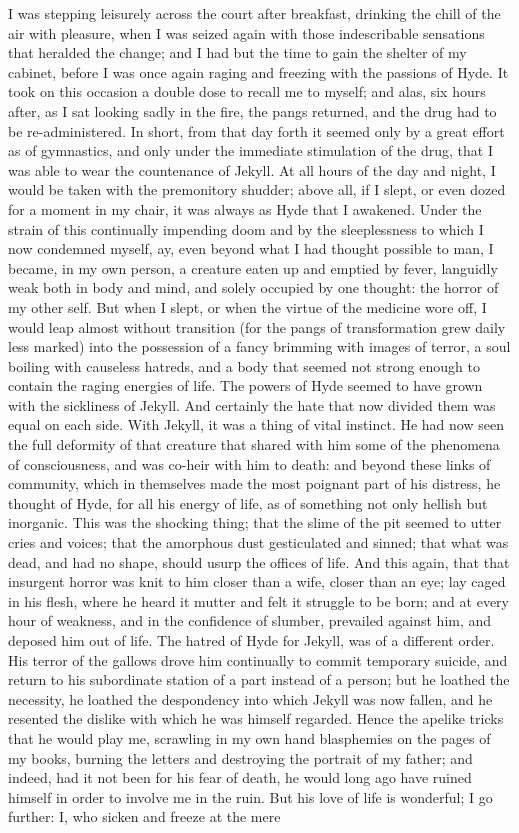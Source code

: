 \documentclass[]{novel}
\begin{document}
I was stepping leisurely across the court after breakfast, drinking the chill of the air with pleasure, when I was seized again with those indescribable sensations that heralded the change; and I had but the time to gain the shelter of my cabinet, before I was once again raging and freezing with the passions of Hyde. It took on this occasion a double dose to recall me to myself; and alas, six hours after, as I sat looking sadly in the fire, the pangs returned, and the drug had to be re-administered. In short, from that day forth it seemed only by a great effort as of gymnastics, and only under the immediate stimulation of the drug, that I was able to wear the countenance of Jekyll. At all hours of the day and night, I would be taken with the premonitory shudder; above all, if I slept, or even dozed for a moment in my chair, it was always as Hyde that I awakened. Under the strain of this continually impending doom and by the sleeplessness to which I now condemned myself, ay, even beyond what I had thought possible to man, I became, in my own person, a creature eaten up and emptied by fever, languidly weak both in body and mind, and solely occupied by one thought: the horror of my other self. But when I slept, or when the virtue of the medicine wore off, I would leap almost without transition (for the pangs of transformation grew daily less marked) into the possession of a fancy brimming with images of terror, a soul boiling with causeless hatreds, and a body that seemed not strong enough to contain the raging energies of life. The powers of Hyde seemed to have grown with the sickliness of Jekyll. And certainly the hate that now divided them was equal on each side. With Jekyll, it was a thing of vital instinct. He had now seen the full deformity of that creature that shared with him some of the phenomena of consciousness, and was co-heir with him to death: and beyond these links of community, which in themselves made the most poignant part of his distress, he thought of Hyde, for all his energy of life, as of something not only hellish but inorganic. This was the shocking thing; that the slime of the pit seemed to utter cries and voices; that the amorphous dust gesticulated and sinned; that what was dead, and had no shape, should usurp the offices of life. And this again, that that insurgent horror was knit to him closer than a wife, closer than an eye; lay caged in his flesh, where he heard it mutter and felt it struggle to be born; and at every hour of weakness, and in the confidence of slumber, prevailed against him, and deposed him out of life. The hatred of Hyde for Jekyll, was of a different order. His terror of the gallows drove him continually to commit temporary suicide, and return to his subordinate station of a part instead of a person; but he loathed the necessity, he loathed the despondency into which Jekyll was now fallen, and he resented the dislike with which he was himself regarded. Hence the apelike tricks that he would play me, scrawling in my own hand blasphemies on the pages of my books, burning the letters and destroying the portrait of my father; and indeed, had it not been for his fear of death, he would long ago have ruined himself in order to involve me in the ruin. But his love of life is wonderful; I go further: I, who sicken and freeze at the mere 
\end{document}
